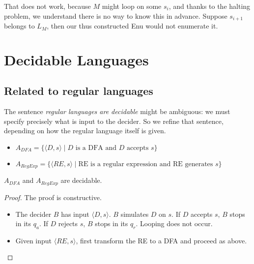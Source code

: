 That does not work, because $M$ might loop on some $s_i$, and thanks to
the halting problem, we understand there is no way to know this in
advance. Suppose $s_{i+1}$ belongs to $L_M$, then our thus constructed
Enu would not enumerate it.



\section{Decidable Languages}

\subsection{Related to regular languages}

The sentence {\em regular languages are decidable} might be ambiguous:
we must specify precisely what is input to the decider. So we refine
that sentence, depending on how the regular language itself is given.


\begin{itemize}
\item
$A_{DFA} = \{\langle D,s \rangle\mid \text{$D$ is a DFA and $D$ accepts $s$} \}$
\item $A_{RegExp} = \{\langle RE,s\rangle\mid \text{RE is a regular expression and RE generates $s$}\}$
\end{itemize}

\begin{theorem} \label{reglandec}
$A_{DFA}$
and $A_{RegExp}$ are decidable.
\end{theorem}
\begin{proof}
The proof is constructive.
\begin{itemize}
\item
The decider $B$ has input $\langle D,s \rangle$. $B$ simulates $D$ on $s$. If
$D$ accepts $s$, $B$ stops in its $q_a$. If $D$ rejects $s$, $B$ stops in its
$q_r$. Looping does not occur.


\item
Given input $\langle RE,s \rangle$, first transform the RE to a DFA
and proceed as above.
\end{itemize}\vspace{-1.5em}
\end{proof}

